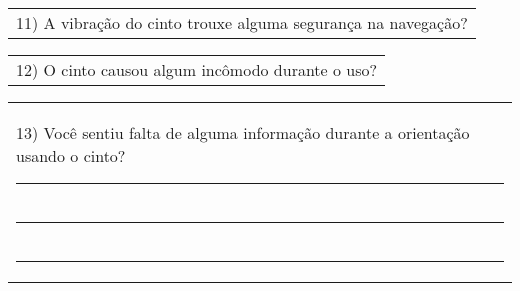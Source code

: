 \begin{table}[!thb]
        
        

    \begin{tabular}{m{1\linewidth}}
        \vspace{2ex}
        11)	A vibração do cinto trouxe alguma segurança na navegação?
    \end{tabular}

        
        

    \begin{tabular}{m{1\linewidth}}
        \vspace{2ex}
        12)	O cinto causou algum incômodo durante o uso?
    \end{tabular}

        
        

    \begin{tabular}{m{1\linewidth}}
        \vspace{2ex}
        13)	Você sentiu falta de alguma informação durante a orientação usando o cinto?

        \noindent
        \rule{6in}{.2mm} \\
        \rule{6in}{.2mm} \\
        \rule{6in}{.2mm}

    \end{tabular}
\end{table}

\FloatBarrier

